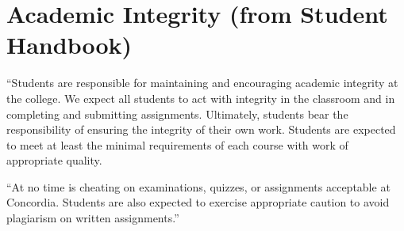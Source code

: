 \documentclass{tufte-handout}
\begin{document}
\section{Academic Integrity (from Student Handbook)}


``Students are responsible for maintaining and encouraging academic integrity at the college. We expect all students to act with integrity in the classroom and in completing and submitting assignments. Ultimately, students bear the responsibility of ensuring the integrity of their own work. Students are expected to meet at least the minimal requirements of each course with work of appropriate quality. 


``At no time is cheating on examinations, quizzes, or assignments acceptable at Concordia. Students are also expected to exercise appropriate caution to avoid plagiarism on written assignments.''
\end{document}
